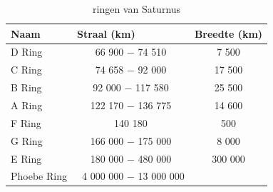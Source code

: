 \documentclass[a4paper]{article}
\begin{document}
	 	 \begin{table}[h]
	 	\caption{ringen van Saturnus}
	 	\centering
	 	\begin{tabular}{|l|cc|}
	 		\hline
\multicolumn{1}{|l|}{\textbf{Naam}}          & \multicolumn{1}{l}{\textbf{Straal (km)}} & \multicolumn{1}{l|}{\textbf{Breedte (km)}} \\ \hline
	 		D Ring                & 66 900 $-$ 74 510                  & 7 500          \\
	 		C Ring                & 74 658 $-$ 92 000                 & 17 500         \\
	 	    B Ring                & 92 000 $-$ 117 580                 & 25 500         \\
	 	    A Ring                & 122 170 $-$ 136 775               & 14 600         \\
	 		F Ring                & 140 180                             & 500          \\
	 		G Ring                & 166 000 $-$ 175 000                & 8 000          \\
	 		E Ring                & 180 000 $-$ 480 000                & 300 000          \\
	 		Phoebe Ring           & ~4 000 000 $-$ 13 000 000           & 
	 		\\ \hline
	 	\end{tabular}
	 \label{tab:2}
	 \end{table}
\end{document}
